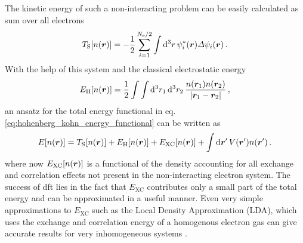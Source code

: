 \documentclass[main.tex]{subfiles}
\begin{document}
The kinetic energy of such a non-interacting problem can be easily calculated as sum over all electrons
\begin{equation}
    T_{\mathrm{S}} [n(\vb*{r})] = - \frac{1}{2} \sum_{i=1}^{N_{\mathrm{e}} / 2} \int \dd[3]{r} \psi_i^* (\vb*{r}) \Delta \psi_i (\vb*{r})\,.
\end{equation}
With the help of this system and the classical electrostatic energy 
\begin{equation}
    E_{\mathrm{H}} [n(\vb*{r})] = \frac{1}{2} \int \int \dd[3]{r_1} \dd[3]{r_2} \frac{n(\vb*{r}_1) n(\vb*{r}_2)}{\vert \vb*{r}_1 - \vb*{r}_2 \vert}\,,
\end{equation}
an ansatz for the total energy functional in eq. \ref{eq:hohenberg_kohn_energy_functional} can be written as
\begin{equation}
    E[n(\vb*{r})] = T_{\mathrm{S}} [n(\vb*{r})] + E_{\mathrm{H}} [n(\vb*{r})] + E_{\mathrm{XC}} [n(\vb*{r})] + \int \dd{\vb*{r}^{\prime}} V(\vb*{r}^{\prime}) n (\vb*{r}^{\prime})\,.
\end{equation}
where now \(E_{\mathrm{XC}} [n(\vb*{r})]\) is a functional of the density accounting for all exchange and correlation effects not present in the non-interacting electron system.
The success of \acrshort{dft} lies in the fact that \(E_{\mathrm{XC}}\) contributes only a small part of the total energy and can be approximated in a useful manner. 
Even very simple approximations to \(E_{\mathrm{XC}}\) such as the Local Density Approximation (LDA), which uses the exchange and correlation energy of a homogenous electron gas can give accurate results for very inhomogeneous systems \cite{harris_adiabatic-connection_1984}.
\end{document}
